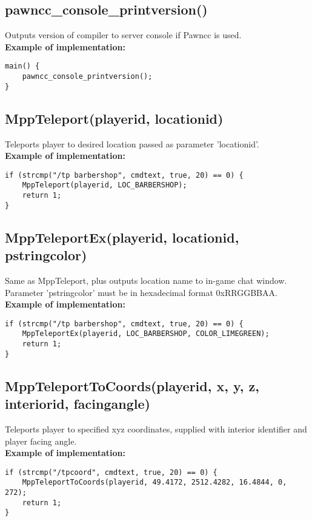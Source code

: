 \documentclass{article}
\begin{document}
\subsection{pawncc\_console\_printversion()}
Outputs version of compiler to server console if Pawncc is used.
\bigskip
\\\textbf{Example of implementation:}
\begin{verbatim}
main() {
    pawncc_console_printversion();
}
\end{verbatim}


\subsection{MppTeleport(playerid, locationid)}
Teleports player to desired location passed as parameter 'locationid'.
\bigskip
\\\textbf{Example of implementation:}
\begin{verbatim}
if (strcmp("/tp barbershop", cmdtext, true, 20) == 0) {
    MppTeleport(playerid, LOC_BARBERSHOP);
    return 1;
}
\end{verbatim}


\subsection{MppTeleportEx(playerid, locationid, pstringcolor)}
Same as MppTeleport, plus outputs location name to in-game chat window. \\Parameter 'pstringcolor' must be in hexadecimal format 0xRRGGBBAA.
\bigskip
\\\textbf{Example of implementation:}
\begin{verbatim}
if (strcmp("/tp barbershop", cmdtext, true, 20) == 0) {
    MppTeleportEx(playerid, LOC_BARBERSHOP, COLOR_LIMEGREEN);
    return 1;
}
\end{verbatim}


\subsection{MppTeleportToCoords(playerid, x, y, z, interiorid, facingangle)}
Teleports player to specified xyz coordinates, supplied with interior identifier and player facing angle.
\bigskip
\\\textbf{Example of implementation:}
\begin{verbatim}
if (strcmp("/tpcoord", cmdtext, true, 20) == 0) {
    MppTeleportToCoords(playerid, 49.4172, 2512.4282, 16.4844, 0, 272);
    return 1;
}
\end{verbatim}
\end{document}
